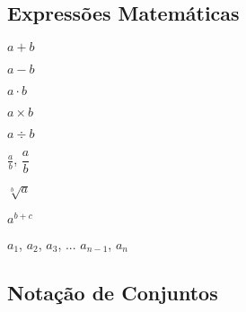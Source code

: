 \documentclass[a4paper,12pt]{article}
\begin{document}
\subsection{Expressões Matemáticas}

$a + b$

$a - b$

$a\cdot b$

$a\times b$

$a\div b$

$\frac{a}{b}$, $\dfrac{a}{b}$

$\sqrt[b]{a}$

$a^{b+c}$

$a_1$, $a_2$, $a_3$, ... $a_{n-1}$, $a_n$

\subsection{Notação de Conjuntos}
\end{document}

